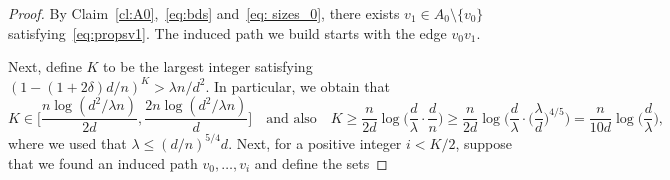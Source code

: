 \documentclass[reqno,a4paper]{amsart}
\theoremstyle{definition}
\begin{document}
\begin{proof}
By Claim~\ref{cl:A0},~\eqref{eq:bds} and~\eqref{eq: sizes_0}, there exists $v_1\in A_0\setminus\{v_0\}$ satisfying~\eqref{eq:propsv1}. 
The induced path we build starts with the edge $v_0v_1$. 

Next, define $K$ to be the largest integer satisfying $(1-(1+2\delta)d/n)^K > \lambda n/d^2$. In particular, we obtain that 
\[K \in \bigg[\frac{n\log(d^2/\lambda n)}{2d},\frac{2n\log(d^2/\lambda n)}{d}\bigg]\quad\text{and also}\quad K\ge \frac{n}{2d} \log\bigg(\frac{d}{\lambda}\cdot \frac{d}{n}\bigg)\ge \frac{n}{2d} \log\bigg(\frac{d}{\lambda}\cdot \bigg(\frac{\lambda}{d}\bigg)^{4/5}\bigg)= \frac{n}{10d} \log\bigg(\frac{d}{\lambda}\bigg),\]
where we used that $\lambda\le (d/n)^{5/4} d$.
Next, for a positive integer $i < K/2$, suppose that we found an induced path $v_0,\ldots,v_i$ and define the sets



\end{proof}
\end{document}
